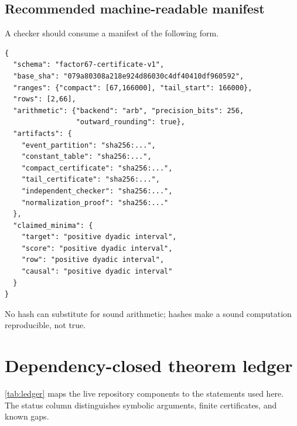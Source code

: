 \documentclass[11pt]{article}
\theoremstyle{definition}
\theoremstyle{remark}
\newcommand{\1}{\mathbf 1}
\begin{document}
\subsection{Recommended machine-readable manifest}

A checker should consume a manifest of the following form.

\begin{lstlisting}[basicstyle=\ttfamily\small,frame=single,breaklines=true]
{
  "schema": "factor67-certificate-v1",
  "base_sha": "079a80308a218e924d86030c4df40410df960592",
  "ranges": {"compact": [67,166000], "tail_start": 166000},
  "rows": [2,66],
  "arithmetic": {"backend": "arb", "precision_bits": 256,
                 "outward_rounding": true},
  "artifacts": {
    "event_partition": "sha256:...",
    "constant_table": "sha256:...",
    "compact_certificate": "sha256:...",
    "tail_certificate": "sha256:...",
    "independent_checker": "sha256:...",
    "normalization_proof": "sha256:..."
  },
  "claimed_minima": {
    "target": "positive dyadic interval",
    "score": "positive dyadic interval",
    "row": "positive dyadic interval",
    "causal": "positive dyadic interval"
  }
}
\end{lstlisting}

No hash can substitute for sound arithmetic; hashes make a sound computation reproducible, not true.

\section{Dependency-closed theorem ledger}\label{sec:ledger}

\cref{tab:ledger} maps the live repository components to the statements used here.  The status column distinguishes symbolic arguments, finite certificates, and known gaps.
\end{document}
